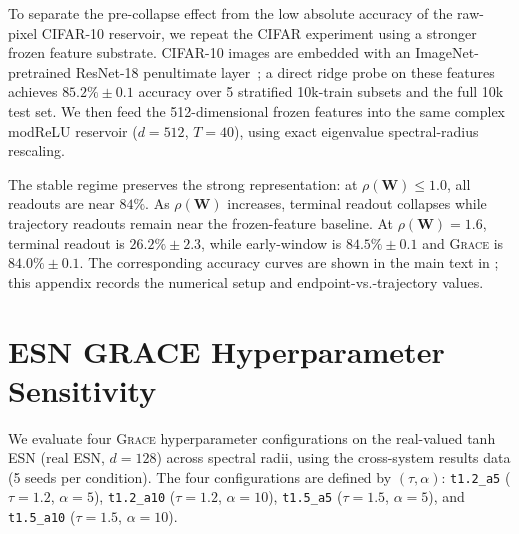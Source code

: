 \documentclass{article}
\theoremstyle{remark}
\newcommand{\bW}{\mathbf{W}}
\newcommand{\grace}{\textnormal{\textsc{Grace}}}
\newcommand{\sr}{\rho(\bW)}
\begin{document}
To separate the pre-collapse effect from the low absolute accuracy of the
raw-pixel CIFAR-10 reservoir, we repeat the CIFAR experiment using a stronger
frozen feature substrate. CIFAR-10 images are embedded with an
ImageNet-pretrained ResNet-18 penultimate layer~\citep{he2016deep}; a direct
ridge probe on these features achieves $85.2\%\pm0.1$ accuracy over 5
stratified 10k-train subsets and the full 10k test set. We then feed the
512-dimensional frozen features into the same complex modReLU reservoir
($d=512$, $T=40$), using exact eigenvalue spectral-radius rescaling.

The stable regime preserves the strong representation: at $\sr \leq 1.0$, all
readouts are near $84\%$. As $\sr$ increases, terminal readout collapses while
trajectory readouts remain near the frozen-feature baseline. At $\sr=1.6$,
terminal readout is $26.2\%\pm2.3$, while early-window is
$84.5\%\pm0.1$ and \grace{} is $84.0\%\pm0.1$.
The corresponding accuracy curves are shown in the main text in
; this appendix records the numerical setup
and endpoint-vs.-trajectory values.


\section{ESN GRACE Hyperparameter Sensitivity}
\label{app:esn_grace}

We evaluate four \grace{} hyperparameter configurations on the real-valued
tanh ESN (real ESN, $d=128$) across spectral radii, using the cross-system
results data (5 seeds per condition). The four configurations are defined
by $(\tau, \alpha)$: \texttt{t1.2\_a5} ($\tau=1.2$, $\alpha=5$),
\texttt{t1.2\_a10} ($\tau=1.2$, $\alpha=10$), \texttt{t1.5\_a5}
($\tau=1.5$, $\alpha=5$), and \texttt{t1.5\_a10} ($\tau=1.5$, $\alpha=10$).
\end{document}
